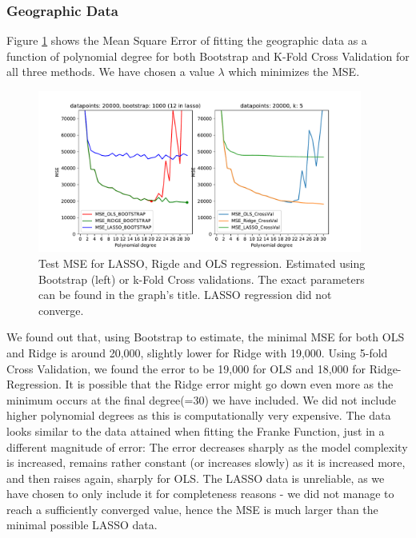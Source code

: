 \documentclass[11pt,a4paper,titlepage]{article}
\begin{document}
\subsubsection{Geographic Data}
Figure \ref{fig:MSE_Korea} shows the Mean Square Error of fitting the geographic data as a function of polynomial degree for both Bootstrap and K-Fold Cross Validation for all three methods. We have chosen a value $\lambda$ which minimizes the MSE. 
\begin{figure}[H]
\centering
\includegraphics[width=0.95\textwidth]{figures/presentable_data/MSE_different_methods_Korea_LARGE.pdf}
\caption[Test MSE for LASSO, Rigde and OLS regression (geo, 20000 points)]{Test MSE for LASSO, Rigde and OLS regression. Estimated using Bootstrap (left) or k-Fold Cross validations. The exact parameters can be found in the graph's title. LASSO regression did not converge.}
\label{fig:MSE_Korea}
\end{figure}
We found out that, using Bootstrap to estimate, the minimal MSE for both OLS and Ridge is around 20,000, slightly lower for Ridge with 19,000. Using 5-fold Cross Validation, we found the error to be 19,000 for OLS and 18,000 for Ridge-Regression. It is possible that the Ridge error might go down even more as the minimum occurs at the final degree(=30) we have included. We did not include higher polynomial degrees as this is computationally very expensive. The data looks similar to the data attained when fitting the Franke Function, just in a different magnitude of error: The error decreases sharply as the model complexity is increased, remains rather constant (or increases slowly) as it is increased more, and then raises again, sharply for OLS. The LASSO data is unreliable, as we have chosen to only include it for completeness reasons - we did not manage to reach a sufficiently converged value, hence the MSE is much larger than the minimal possible LASSO data.\\
\end{document}
